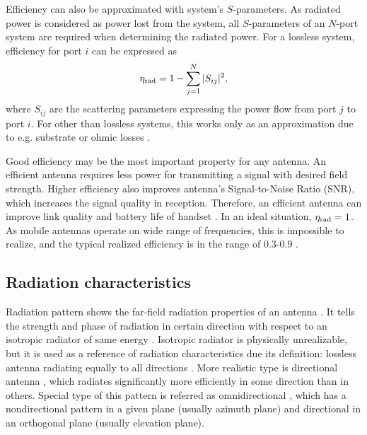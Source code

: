 Efficiency can also be approximated with system's $S$-parameters. As radiated power is considered as power lost from the system, all $S$-parameters of an $N$-port system are required when determining the radiated power. For a lossless system, efficiency for port $i$ \cite{lehtovuori_phd} can be expressed as
\begin{equation}
\label{eq:eff_aprx}
    {\eta}_{\mathrm{rad}} = 1-\sum_{j=1}^{N}|S_{ij}|^2,
\end{equation}
where $S_{ij}$ are the scattering parameters expressing the power flow from port $j$ to port $i$. For other than lossless systems, this works only as an approximation due to e.g. substrate or ohmic losses \cite{lehtovuori_phd}.

Good efficiency may be the most important property for any antenna. An efficient antenna requires less power for transmitting a signal with desired field strength. Higher efficiency also improves antenna's Signal-to-Noise Ratio (SNR), which increases the signal quality in reception. Therefore, an efficient antenna can improve link quality and battery life of handset \cite{molisch}. In an ideal situation, ${\eta}_{\mathrm{rad}}=1$. As mobile antennas operate on wide range of frequencies, this is impossible to realize, and the typical realized efficiency is in the range of $0.3$-$0.9$ \cite{volakis,ilvonen_phd}. %


\subsection{Radiation characteristics}
\label{sec:pattern}
Radiation pattern shows the far-field radiation properties of an antenna \cite{balanis, stutzman}. It tells the strength and phase of radiation in certain direction with respect to an isotropic radiator of same energy \cite{balanis}. Isotropic radiator is physically unrealizable, but it is used as a reference of radiation characteristics due its definition: lossless antenna radiating equally to all directions \cite{balanis}. More realistic type is directional antenna \cite{balanis}, which radiates significantly more efficiently in some direction than in others. Special type of this pattern is referred as omnidirectional \cite{balanis}, which has a nondirectional pattern in a given plane (usually azimuth plane) and directional in an orthogonal plane (usually elevation plane).

